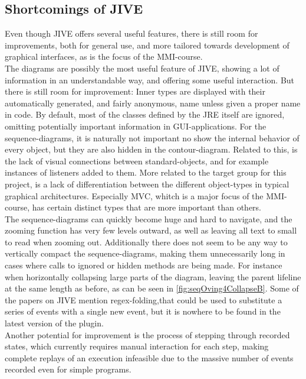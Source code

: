 \subsection{Shortcomings of JIVE}\label{jiveShortcomings}

Even though JIVE offers several useful features, there is still room for improvements, both for general use, and more tailored towards development of graphical interfaces, as is the focus of the MMI-course.
~\\

The diagrams are possibly the most useful feature of JIVE, showing a lot of information in an understandable way, and offering some useful interaction.
But there is still room for improvement:
Inner types are displayed with their automatically generated, and fairly anonymous, name unless given a proper name in code.
By default, most of the classes defined by the JRE itself are ignored, omitting potentially important information in GUI-applications.
For the sequence-diagrams, it is naturally not important no show the internal behavior of every object, but they are also hidden in the contour-diagram.
Related to this, is the lack of visual connections between standard-objects, and for example instances of listeners added to them.
More related to the target group for this project, is a lack of differentiation between the different object-types in typical graphical architectures.
Especially MVC, whitch is a major focus of the MMI-course, has certain distinct types that are more important than others.
~\\

The sequence-diagrams can quickly become huge and hard to navigate, and the zooming function has very few levels outward, as well as leaving all text to small to read when zooming out.
Additionally there does not seem to be any way to vertically compact the sequence-diagrams, making them unnecessarily long in cases where calls to ignored or hidden methods are being made.
For instance when horizontally collapsing large parts of the diagram, leaving the parent lifeline at the same length as before, as can be seen in \autoref{fig:seqOving4CollapseB}.
Some of the papers on JIVE mention regex-folding,that could be used to substitute a series of events with a single new event, but it is nowhere to be found in the latest version of the plugin.
~\\

Another potential for improvement is the process of stepping through recorded states, which currently requires manual interaction for each step, making complete replays of an execution infeasible due to the massive number of events recorded even for simple programs.
~\\

